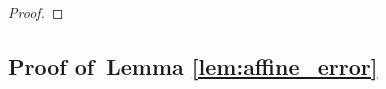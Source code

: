 \documentclass[aps,prl,reprint,twocolumn,groupedaddress,showpacs]{revtex4-1}
\def\r{{\bf r}}
\begin{document}
\begin{proof}
\end{proof}
      
\subsection{Proof of~Lemma \ref{lem:affine_error}}
\end{document}
